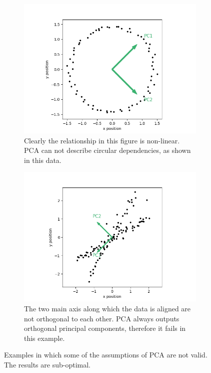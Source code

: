 \documentclass[a4paper]{IEEEtran}
\begin{document}
\begin{figure}
	\centering
	\begin{subfigure}{0.5\textwidth}
		\includegraphics[width=\textwidth]{figs/pca_fails_nonlinear}
		\caption{Clearly the relationship in this figure is non-linear. PCA can not describe circular dependencies, as shown in this data.}
		\label{fig:pca_fails_nonlinear}
	\end{subfigure}
	\hfill
	\begin{subfigure}{0.5\textwidth}
		\includegraphics[width=\textwidth]{figs/pca_fails_nonorthogonal}
		\caption{The two main axis along which the data is aligned are not orthogonal to each other. PCA always outputs orthogonal principal components, therefore it fails in this example.}
		\label{fig:pca_fails_nonorthogonal}
	\end{subfigure}
	
	\caption{Examples in which some of the assumptions of PCA are not valid. The results are sub-optimal.}
	\label{fig:pca_fails}
\end{figure}
\end{document}
